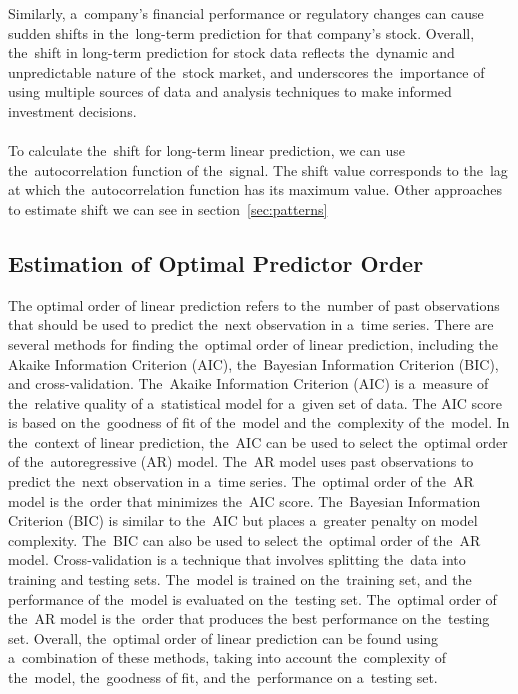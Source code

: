 Similarly, a~company's financial performance or regulatory changes can cause sudden shifts in the~long-term prediction
for that company's stock. Overall, the~shift in long-term prediction for stock data reflects the~dynamic and
unpredictable nature of the~stock market, and underscores the~importance of using multiple sources of data and analysis
techniques to make informed investment decisions.\\
\\
To calculate the~shift for long-term linear prediction, we can use the~autocorrelation function of the~signal.
The shift value corresponds to the~lag at which the~autocorrelation function has its maximum value. Other approaches to estimate shift we can see in section~\ref{sec:patterns}


\subsection{Estimation of Optimal Predictor Order} \label{subsec:orderlp}
The optimal order of linear prediction refers to the~number of past observations that should be used to predict the~next
observation in a~time series. There are several methods for finding the~optimal order of linear prediction, including
the Akaike Information Criterion (AIC), the~Bayesian Information Criterion (BIC), and cross-validation. The~Akaike
Information Criterion (AIC) is a~measure of the~relative quality of a~statistical model for a~given set of data.
The AIC score is based on the~goodness of fit of the~model and the~complexity of the~model. In the~context of linear
prediction, the~AIC can be used to select the~optimal order of the~autoregressive (AR) model. The~AR model uses past
observations to predict the~next observation in a~time series. The~optimal order of the~AR model is the~order that
minimizes the~AIC score. The~Bayesian Information Criterion (BIC) is similar to the~AIC but places a~greater penalty
on model complexity. The~BIC can also be used to select the~optimal order of the~AR model. Cross-validation is a
technique that involves splitting the~data into training and testing sets. The~model is trained on the~training set, and
the performance of the~model is evaluated on the~testing set. The~optimal order of the~AR model is the~order that produces
the best performance on the~testing set. Overall, the~optimal order of linear prediction can be found using a~combination
of these methods, taking into account the~complexity of the~model, the~goodness of fit, and the~performance on a~testing set.\\
